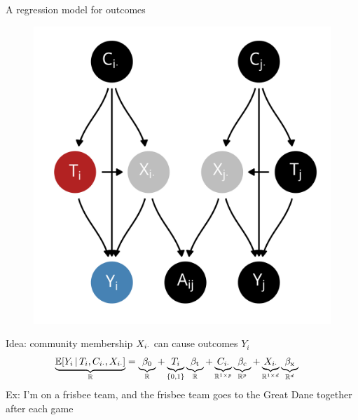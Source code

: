\documentclass{beamer}
\theoremstyle{remark}
\begin{document}
\begin{frame}{A regression model for outcomes}

    \centering

    \begin{figure}
        \includegraphics[scale=0.35]{figures/dags/homophily-mediating.png}
        \label{fig:homophily-mediating-again}
    \end{figure}

    Idea: community membership $X_{i \cdot}$ can cause outcomes $Y_i$
    \begin{align*}
        \underbrace{\E[T_i, \C_{i \cdot}, \X_{i \cdot}]{Y_i}}_{\R}
         & = \underbrace{\betazero}_{\R}
        + \underbrace{T_i}_{\{0, 1\}} \underbrace{\betat}_{\R}
        + \underbrace{\C_{i \cdot}}_{\R^{1 \times p}} \underbrace{\betac}_{\R^{p}}
        + \underbrace{\X_{i \cdot}}_{\R^{1 \times d}} \underbrace{\betax}_{\R^d}
    \end{align*}
    Ex: I'm on a frisbee team, and the frisbee team goes to the Great Dane together after each game

\end{frame}
\end{document}
